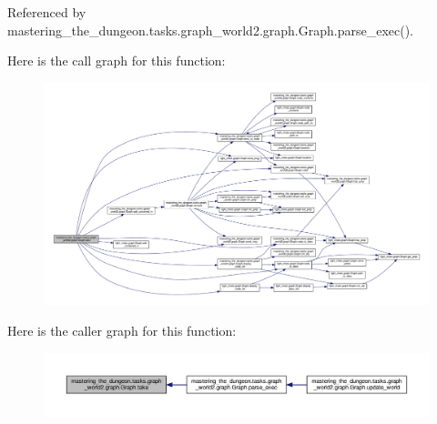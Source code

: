 Referenced by mastering\+\_\+the\+\_\+dungeon.\+tasks.\+graph\+\_\+world2.\+graph.\+Graph.\+parse\+\_\+exec().

Here is the call graph for this function\+:
\nopagebreak
\begin{figure}[H]
\begin{center}
\leavevmode
\includegraphics[width=350pt]{classmastering__the__dungeon_1_1tasks_1_1graph__world2_1_1graph_1_1Graph_af0e00cef49829df438b8687ff03afc94_cgraph}
\end{center}
\end{figure}
Here is the caller graph for this function\+:
\nopagebreak
\begin{figure}[H]
\begin{center}
\leavevmode
\includegraphics[width=350pt]{classmastering__the__dungeon_1_1tasks_1_1graph__world2_1_1graph_1_1Graph_af0e00cef49829df438b8687ff03afc94_icgraph}
\end{center}
\end{figure}
\mbox{\label{classmastering__the__dungeon_1_1tasks_1_1graph__world2_1_1graph_1_1Graph_a8a04e4cf35e5e0e502c1b529683b82f6}} 
